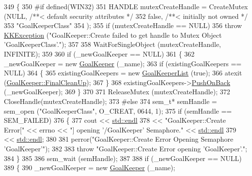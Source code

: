 \begin{DoxyCode}
349 \{
350 \textcolor{preprocessor}{#if  defined(WIN32)}
351   HANDLE  mutexCreateHandle = CreateMutex (NULL,                 \textcolor{comment}{/**< default security attributes */}
352                                            \textcolor{keyword}{false},                \textcolor{comment}{/**< initially not owned */}
353                                            \textcolor{stringliteral}{"GoalKeeperClass"}
354                                           );
355   \textcolor{keywordflow}{if}  (mutexCreateHandle == NULL)
356     \textcolor{keywordflow}{throw} \hyperlink{class_k_k_b_1_1_k_k_exception}{KKException} (\textcolor{stringliteral}{"GoalKeeper::Create  failed to get handle to Mutex Object
       'GoalKeeperClass'."});
357 
358   WaitForSingleObject (mutexCreateHandle, INFINITE);
359 
360   \textcolor{keywordflow}{if}  (\_newGoalKeeper == NULL)
361   \{
362     \_newGoalKeeper = \textcolor{keyword}{new} \hyperlink{class_k_k_b_1_1_goal_keeper}{GoalKeeper} (\_name);
363     \textcolor{keywordflow}{if}  (existingGoalKeepers == NULL)
364     \{
365       existingGoalKeepers = \textcolor{keyword}{new} \hyperlink{class_k_k_b_1_1_goal_keeper_list}{GoalKeeperList} (\textcolor{keyword}{true});
366       atexit (\hyperlink{class_k_k_b_1_1_goal_keeper_aefe6575fd93ee87f4dba12607d1a1fcf}{GoalKeeper::FinalCleanUp});
367     \}
368     existingGoalKeepers->\hyperlink{class_k_k_b_1_1_k_k_queue_aa9fba4632b54268bf71ecb42dee0b575}{PushOnBack} (\_newGoalKeeper);
369   \}
370 
371   ReleaseMutex (mutexCreateHandle);
372   CloseHandle(mutexCreateHandle);
373 \textcolor{preprocessor}{#else}
374   sem\_t*  semHandle = sem\_open (\textcolor{stringliteral}{"GoalKeeperClass"}, O\_CREAT, 0644, 1);
375   \textcolor{keywordflow}{if}  (semHandle == SEM\_FAILED)
376   \{
377     cout << \hyperlink{namespace_k_k_b_ad1f50f65af6adc8fa9e6f62d007818a8}{std::endl}
378          << \textcolor{stringliteral}{"GoalKeeper::Create  Error["} << errno << \textcolor{stringliteral}{"] opening '/GoalKeeper' Semaphore."} << 
      \hyperlink{namespace_k_k_b_ad1f50f65af6adc8fa9e6f62d007818a8}{std::endl}
379          << \hyperlink{namespace_k_k_b_ad1f50f65af6adc8fa9e6f62d007818a8}{std::endl};
380 
381     perror(\textcolor{stringliteral}{"GoalKeeper::Create   Error Opening Semaphore  'GoalKeeper'"});
382 
383     \textcolor{keywordflow}{throw} \textcolor{stringliteral}{"GoalKeeper::Create    Error opening 'GoalKeeper'."};
384   \}
385 
386   sem\_wait (semHandle);
387 
388   \textcolor{keywordflow}{if}  (\_newGoalKeeper == NULL)
389   \{
390     \_newGoalKeeper = \textcolor{keyword}{new} \hyperlink{class_k_k_b_1_1_goal_keeper}{GoalKeeper} (\_name);

\end{DoxyCode}

